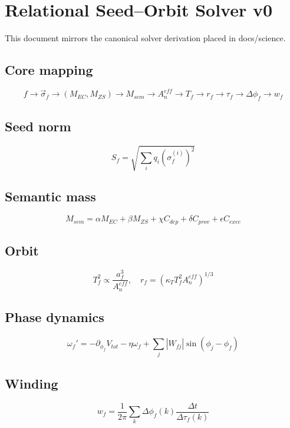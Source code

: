 \documentclass{article}
\begin{document}
\section*{Relational Seed--Orbit Solver v0}

This document mirrors the canonical solver derivation placed in docs/science.

\subsection*{Core mapping}
\[
f \to \vec{\sigma}_f \to (M_{EC}, M_{ZS}) \to M_{sem} \to A_n^{eff} \to T_f \to r_f \to \tau_f \to \Delta\phi_f \to w_f
\]

\subsection*{Seed norm}
\[
S_f = \sqrt{\sum_i q_i (\sigma_f^{(i)})^2}
\]

\subsection*{Semantic mass}
\[
M_{sem} = \alpha M_{EC} + \beta M_{ZS} + \chi C_{dep} + \delta C_{prov} + \epsilon C_{exec}
\]

\subsection*{Orbit}
\[
T_f^2 \propto \frac{a_f^3}{A_n^{eff}}, \quad r_f = (\kappa_T T_f^2 A_n^{eff})^{1/3}
\]

\subsection*{Phase dynamics}
\[
\omega_f' = -\partial_{\phi_f}V_{tot} - \eta \omega_f + \sum_j |W_{fj}|\sin(\phi_j - \phi_f)
\]

\subsection*{Winding}
\[
w_f = \frac{1}{2\pi}\sum_k \Delta\phi_f(k) \frac{\Delta t}{\Delta\tau_f(k)}
\]
\end{document}
